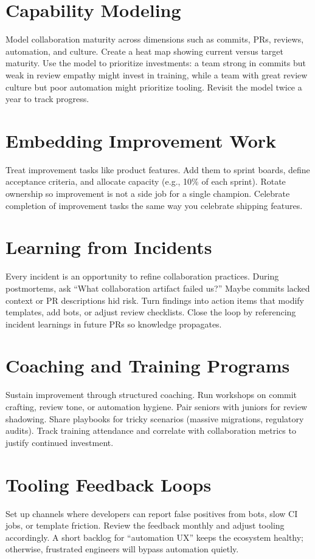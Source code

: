 \section{Capability Modeling}
Model collaboration maturity across dimensions such as commits, PRs, reviews, automation, and culture. Create a heat map showing current versus target maturity. Use the model to prioritize investments: a team strong in commits but weak in review empathy might invest in training, while a team with great review culture but poor automation might prioritize tooling. Revisit the model twice a year to track progress.

\section{Embedding Improvement Work}
Treat improvement tasks like product features. Add them to sprint boards, define acceptance criteria, and allocate capacity (e.g., 10\% of each sprint). Rotate ownership so improvement is not a side job for a single champion. Celebrate completion of improvement tasks the same way you celebrate shipping features.

\section{Learning from Incidents}
Every incident is an opportunity to refine collaboration practices. During postmortems, ask ``What collaboration artifact failed us?'' Maybe commits lacked context or PR descriptions hid risk. Turn findings into action items that modify templates, add bots, or adjust review checklists. Close the loop by referencing incident learnings in future PRs so knowledge propagates.

\section{Coaching and Training Programs}
Sustain improvement through structured coaching. Run workshops on commit crafting, review tone, or automation hygiene. Pair seniors with juniors for review shadowing. Share playbooks for tricky scenarios (massive migrations, regulatory audits). Track training attendance and correlate with collaboration metrics to justify continued investment.

\section{Tooling Feedback Loops}
Set up channels where developers can report false positives from bots, slow CI jobs, or template friction. Review the feedback monthly and adjust tooling accordingly. A short backlog for ``automation UX'' keeps the ecosystem healthy; otherwise, frustrated engineers will bypass automation quietly.


